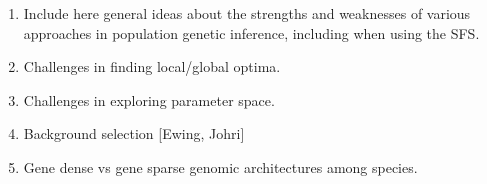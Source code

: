 \documentclass[]{article}
\begin{document}
\begin{enumerate}
    \item Include here general ideas about the strengths and weaknesses of
        various approaches in population genetic inference, including when
        using the SFS.
    \item Challenges in finding local/global optima.
    \item Challenges in exploring parameter space.
    \item Background selection [Ewing, Johri]
    \item Gene dense vs gene sparse genomic architectures among species.
\end{enumerate}



\end{document}
